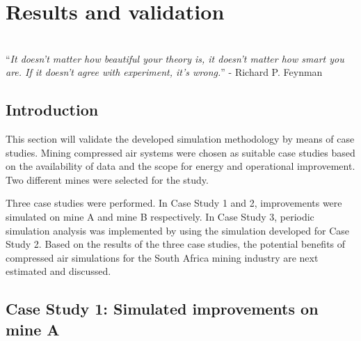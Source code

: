 \chapter{Results and validation}
\thispagestyle{empty}
\vspace{40em}
\hrulefill \\
\enquote{\textit{It doesn't matter how beautiful your theory is, it doesn't matter how smart you are. If it doesn't agree with experiment, it's wrong.}} - Richard P. Feynman\\
\newpage
\section{Introduction}
This section will validate the developed simulation methodology by means of case studies. Mining compressed air systems were chosen as suitable case studies based on the availability of data and the scope for energy and operational improvement. Two different mines were selected for the study. 
\par 
Three case studies were performed. In Case Study 1 and 2, improvements were simulated on mine A and mine B respectively. In Case Study 3, periodic simulation analysis was implemented by using the simulation developed for Case Study 2. Based on the results of the three case studies, the potential benefits of compressed air simulations for the South Africa mining industry are next estimated and discussed.

\section{Case Study 1: Simulated improvements on mine A}

